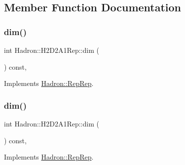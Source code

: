 \subsection{Member Function Documentation}
\mbox{\label{structHadron_1_1H2D2A1Rep_aad683d8986031b8f6a2b9e5ab83a5b17}} 
\subsubsection{\texorpdfstring{dim()}{dim()}\hspace{0.1cm}{\footnotesize\ttfamily [1/5]}}
{\footnotesize\ttfamily int Hadron\+::\+H2\+D2\+A1\+Rep\+::dim (\begin{DoxyParamCaption}{ }\end{DoxyParamCaption}) const\hspace{0.3cm}{\ttfamily [inline]}, {\ttfamily [virtual]}}



Implements \mbox{\hyperlink{structHadron_1_1RepRep_a92c8802e5ed7afd7da43ccfd5b7cd92b}{Hadron\+::\+Rep\+Rep}}.

\mbox{\label{structHadron_1_1H2D2A1Rep_aad683d8986031b8f6a2b9e5ab83a5b17}} 
\subsubsection{\texorpdfstring{dim()}{dim()}\hspace{0.1cm}{\footnotesize\ttfamily [2/5]}}
{\footnotesize\ttfamily int Hadron\+::\+H2\+D2\+A1\+Rep\+::dim (\begin{DoxyParamCaption}{ }\end{DoxyParamCaption}) const\hspace{0.3cm}{\ttfamily [inline]}, {\ttfamily [virtual]}}



Implements \mbox{\hyperlink{structHadron_1_1RepRep_a92c8802e5ed7afd7da43ccfd5b7cd92b}{Hadron\+::\+Rep\+Rep}}.

\mbox{\label{structHadron_1_1H2D2A1Rep_aad683d8986031b8f6a2b9e5ab83a5b17}} 
